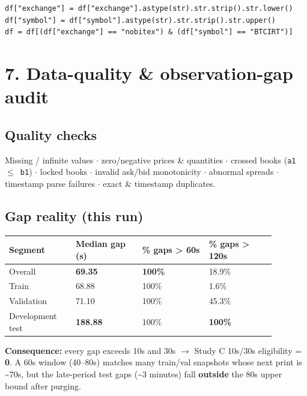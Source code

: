 \documentclass[11pt,a4paper]{article}
\begin{document}
\begin{verbatim}
df["exchange"] = df["exchange"].astype(str).str.strip().str.lower()
df["symbol"] = df["symbol"].astype(str).str.strip().str.upper()
df = df[(df["exchange"] == "nobitex") & (df["symbol"] == "BTCIRT")]
\end{verbatim}

\vspace{0.5em}

\section{7. Data-quality \& observation-gap audit}

\subsection{Quality checks}

Missing / infinite values $\cdot$ zero/negative prices \& quantities $\cdot$ crossed books (\texttt{a1 $\le$ b1}) $\cdot$ locked books $\cdot$ invalid ask/bid monotonicity $\cdot$ abnormal spreads $\cdot$ timestamp parse failures $\cdot$ exact \& timestamp duplicates.


\subsection{Gap reality (this run)}

\begin{center}
\begin{tabular}{L{0.22\linewidth}L{0.22\linewidth}L{0.22\linewidth}L{0.22\linewidth}}
\toprule
Segment & Median gap (s) & \% gaps > 60s & \% gaps > 120s \\
\midrule
Overall & \textbf{69.35} & \textbf{100\%} & 18.9\% \\
Train & 68.88 & 100\% & 1.6\% \\
Validation & 71.10 & 100\% & 45.3\% \\
Development test & \textbf{188.88} & 100\% & \textbf{100\%} \\
\bottomrule
\end{tabular}
\end{center}
\vspace{0.35em}

\textbf{Consequence:} every gap exceeds 10s and 30s $\rightarrow$ Study C 10s/30s eligibility = \textbf{0}. A 60s window (40--80s) matches many train/val snapshots whose next print is \textasciitilde{}70s, but the late-period test gaps (\textasciitilde{}3 minutes) fall \textbf{outside} the 80s upper bound after purging.
\end{document}
